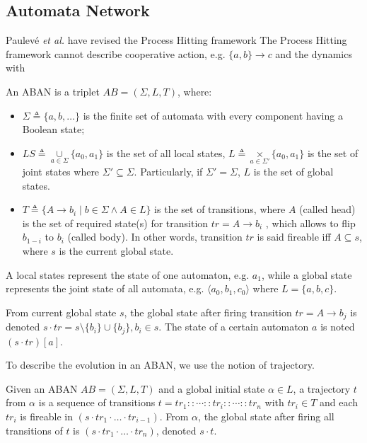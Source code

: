\subsection{Automata Network}
Paulev\'e \textit{et al.} have revised the Process Hitting framework \cite{folschette2015}
The Process Hitting framework cannot describe cooperative action, e.g. $\{a,b\}\to c$ and the dynamics with 

\begin{definition}[ABAN]
An ABAN is a triplet $AB = (\Sigma,L,T)$, where:
\begin{itemize}
\item $\Sigma\triangleq\{a,b,\ldots\}$ is the finite set of automata with every component having a Boolean state;
\item $LS\triangleq \underset{a\in \Sigma}{\cup} \{a_0,a_1\}$ is the set of all local states, $L\triangleq \underset{a\in \Sigma'}{\times} \{a_0,a_1\}$ is the set of joint states where $\Sigma'\subseteq\Sigma$. Particularly, if $\Sigma'=\Sigma$, $L$ is the set of global states. 
\item $T\triangleq \{A\rightarrow b_i\mid b\in \Sigma \land A\in L\}$ is the set of transitions, where $A$ (called head) is the set of required state(s) for transition $tr=A\to b_i$ , which allows to flip $b_{1-i}$ to $b_i$ (called body). In other words, transition $tr$ is said fireable iff $A\subseteq s$, where $s$ is the current global state.
\end{itemize}
\end{definition}

A local states represent the state of one automaton, e.g. $a_1$, while a global state represents the joint state of all automata, e.g. $\langle a_0, b_1,c_0 \rangle$ where $L=\{a,b,c\}$.

\begin{definition}[Dynamics]
    From current global state $s$, the global state after firing transition $tr=A\to b_j$ is denoted $s \cdot tr = s \setminus \{b_i\} \cup \{b_j\}, b_i \in s$.
    The state of a certain automaton $a$ is noted $(s\cdot tr)[a]$.
\end{definition}

To describe the evolution in an ABAN, we use the notion of trajectory.
\begin{definition}[Trajectory]
Given an ABAN $AB = (\Sigma,L,T)$ and a global initial state $\alpha\in L$, a trajectory $t$ from $\alpha$ is a sequence of transitions $t=tr_1::\cdots :: tr_i::\cdots ::tr_n$ with $tr_i\in T$ and each $tr_i$ is fireable in $(s \cdot tr_1 \cdot \ldots \cdot tr_{i-1})$.
From $\alpha$, the global state after firing all transitions of $t$ is $(s \cdot tr_1 \cdot \ldots \cdot tr_n)$, denoted $s \cdot t$.
\end{definition}

